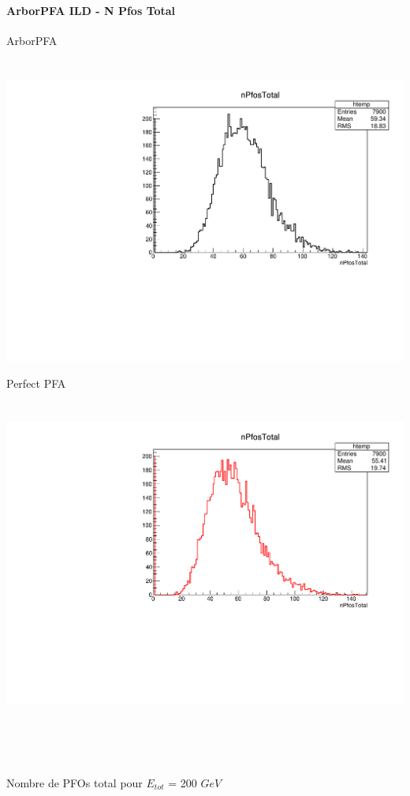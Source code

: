 \documentclass[8pt]{beamer}
\begin{document}
  \begin{frame}
  \frametitle{\backup}
  \framesubtitle{ArborPFA ILD - N Pfos Total}
    \begin{minipage}{0.48\linewidth}
      \begin{center}
        ArborPFA \\
        ~ \\
        ~~~~~\includegraphics[width=\linewidth]{nPfosTotal_ArborPFA.pdf}
      \end{center}
    \end{minipage}
    \begin{minipage}{0.48\linewidth}
      \begin{center}
        Perfect PFA \\
        ~ \\
        ~~~~~\includegraphics[width=\linewidth]{nPfosTotal_PerfectPFA.pdf}
      \end{center}
    \end{minipage}
    ~ \\
    ~ \\
    ~ \\
    \begin{center} Nombre de PFOs total pour $E_{tot}$ = 200 $GeV$ \end{center}
  \end{frame}
\end{document}
